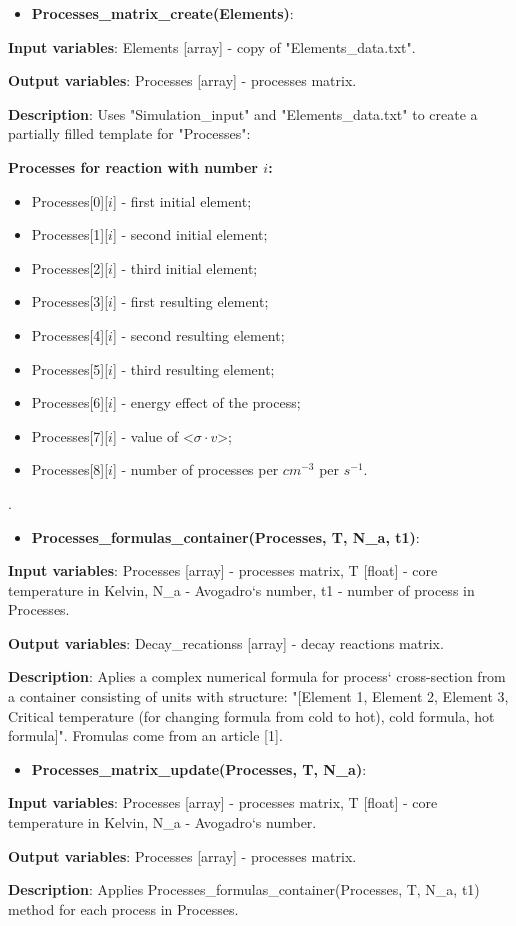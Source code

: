 \documentclass[a4paper,12pt]{article}
\newcommand{\namefunction}[4]{
  \begin{itemize}
    \item \textbf{#1}:
  \end{itemize}
  
  \textbf{Input variables}: #2.
  
  \textbf{Output variables}: #4.
  
  \textbf{Description}: #3.
}
\begin{document}
\namefunction{Processes\_matrix\_create(Elements)}{Elements [array] - copy of "Elements\_data.txt"}{Uses "Simulation\_input" and "Elements\_data.txt" to create a partially filled template for "Processes":

\textbf{Processes for reaction with number $i$:}
\begin{itemize}
    \item Processes[0][$i$] - first initial element;
    \item Processes[1][$i$] - second initial element;
    \item Processes[2][$i$] - third initial element;
    \item Processes[3][$i$] - first resulting element;
    \item Processes[4][$i$] - second resulting element;
    \item Processes[5][$i$] - third resulting element;
    \item Processes[6][$i$] - energy effect of the process;
    \item Processes[7][$i$] - value of <$\sigma \cdot v$>;
    \item Processes[8][$i$] - number of processes per $cm^{-3}$ per $s^{-1}$.
\end{itemize}

}{Processes [array] - processes matrix}

\vspace{1em}

\namefunction{Processes\_formulas\_container(Processes, T, N\_a, t1)}{Processes [array] - processes matrix, T [float] - core temperature in Kelvin, N\_a - Avogadro`s number, t1 - number of process in Processes}{Aplies a complex numerical formula for process` cross-section from a container consisting of units with structure: "[Element 1, Element 2, Element 3, Critical temperature (for changing formula from cold to hot), cold formula, hot formula]". Fromulas come from an article [1]}{Decay\_recationss [array] - decay reactions matrix}

\vspace{1em}

\namefunction{Processes\_matrix\_update(Processes, T, N\_a)}{Processes [array] - processes matrix, T [float] - core temperature in Kelvin, N\_a - Avogadro`s number}{Applies Processes\_formulas\_container(Processes, T, N\_a, t1) method for each process in Processes}{Processes [array] - processes matrix}


\vspace{1em}
\end{document}

